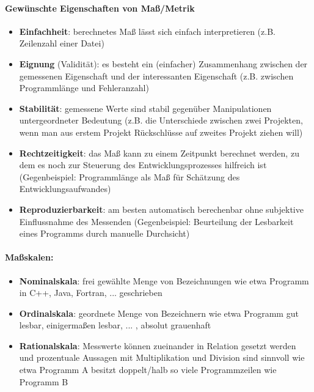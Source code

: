 \paragraph{Gewünschte Eigenschaften von Maß/Metrik}
\begin{itemize}
	\item \textbf{Einfachheit}: berechnetes Maß lässt sich einfach interpretieren (z.B. Zeilenzahl einer Datei)
	\item \textbf{Eignung} (Validität):  es besteht ein (einfacher) Zusammenhang zwischen der gemessenen Eigenschaft und der interessanten Eigenschaft (z.B. zwischen Programmlänge und Fehleranzahl)
	\item \textbf{Stabilität}:  gemessene Werte sind stabil gegenüber Manipulationen untergeordneter Bedeutung (z.B. die Unterschiede zwischen zwei Projekten, wenn man aus erstem Projekt Rückschlüsse auf zweites Projekt ziehen will)
	\item \textbf{Rechtzeitigkeit}: das Maß kann zu einem Zeitpunkt berechnet werden, zu dem es noch zur Steuerung des Entwicklungsprozesses hilfreich ist (Gegenbeispiel: Programmlänge als Maß für Schätzung des Entwicklungsaufwandes)
	\item \textbf{Reproduzierbarkeit}: am besten automatisch berechenbar ohne subjektive Einflussnahme des Messenden (Gegenbeispiel: Beurteilung der Lesbarkeit eines Programms durch manuelle Durchsicht)
\end{itemize}

\paragraph{Maßskalen:}
\begin{itemize}
	\item \textbf{Nominalskala}: frei gewählte Menge von Bezeichnungen wie etwa Programm in C++, Java, Fortran, ... geschrieben 
	\item \textbf{Ordinalskala}: geordnete Menge von Bezeichnern wie etwa Programm gut lesbar, einigermaßen lesbar, ... , absolut grauenhaft
	\item \textbf{Rationalskala}: Messwerte können zueinander in Relation gesetzt werden und prozentuale Aussagen mit Multiplikation und Division sind sinnvoll wie etwa Programm A besitzt doppelt/halb so viele Programmzeilen wie Programm B
\end{itemize}

